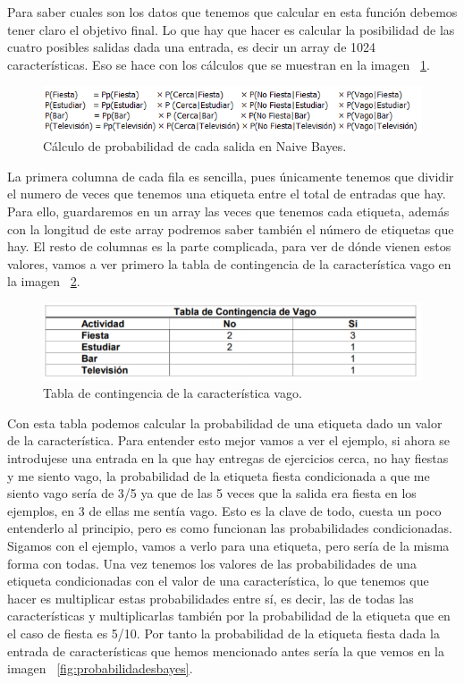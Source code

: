 \documentclass[a4paper, 12pt]{book}
\begin{document}
Para saber cuales son los datos que tenemos que calcular en esta función debemos tener claro el objetivo final. Lo que hay que hacer es calcular la posibilidad de las cuatro posibles salidas dada una entrada, es decir un array de 1024 características. Eso se hace con los cálculos que se muestran en la imagen ~\ref{fig:probabilidadbayes}. 

\begin{figure}
	\centering
	\includegraphics[width=12cm, keepaspectratio]{img/probabilidadbayes}
	\caption{Cálculo de probabilidad de cada salida en Naive Bayes.}			
	\label{fig:probabilidadbayes}
\end{figure}

La primera columna de cada fila es sencilla, pues únicamente tenemos que dividir el numero de veces que tenemos una etiqueta entre el total de entradas que hay. Para ello, guardaremos en un array las veces que tenemos cada etiqueta, además con la longitud de este array podremos saber también el número de etiquetas que hay. 
El resto de columnas es la parte complicada, para ver de dónde vienen estos valores, vamos a ver primero la tabla de contingencia de la característica vago en la imagen ~\ref{fig:tablavago}. 

\begin{figure}
	\centering
	\includegraphics[width=12cm, keepaspectratio]{img/tablavago}
	\caption{Tabla de contingencia de la característica vago.}			
	\label{fig:tablavago}
\end{figure}

Con esta tabla podemos calcular la probabilidad de una etiqueta dado un valor de la característica. Para entender esto mejor vamos a ver el ejemplo, si ahora se introdujese una entrada en la que hay entregas de ejercicios cerca, no hay fiestas y me siento vago, la probabilidad de la etiqueta fiesta condicionada a que me siento vago sería de 3/5 ya que de las 5 veces que la salida era fiesta en los ejemplos, en 3 de ellas me sentía vago. Esto es la clave de todo, cuesta un poco entenderlo al principio, pero es como funcionan las probabilidades condicionadas.\\
Sigamos con el ejemplo, vamos a verlo para una etiqueta, pero sería de la misma forma con todas. Una vez tenemos los valores de las probabilidades de una etiqueta condicionadas con el valor de una característica, lo que tenemos que hacer es multiplicar estas probabilidades entre sí, es decir, las de todas las características y multiplicarlas también por la probabilidad de la etiqueta que en el caso de fiesta es 5/10. Por tanto la probabilidad de la etiqueta fiesta dada la entrada de características que hemos mencionado antes sería la que vemos en la imagen ~\ref{fig:probabilidadesbayes}. 
\end{document}
